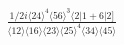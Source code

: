 \documentclass[varwidth, border=5pt]{standalone}
\begin{document}
\begin{my}
$\begin{gathered}
\scriptscriptstyle\frac{1/2i\langle24\rangle^4\langle56\rangle^3\langle2|1+6|2]}{\langle12\rangle\langle16\rangle\langle23\rangle\langle25\rangle^4\langle34\rangle\langle45\rangle}
\end{gathered}$
\end{my}
\end{document}
